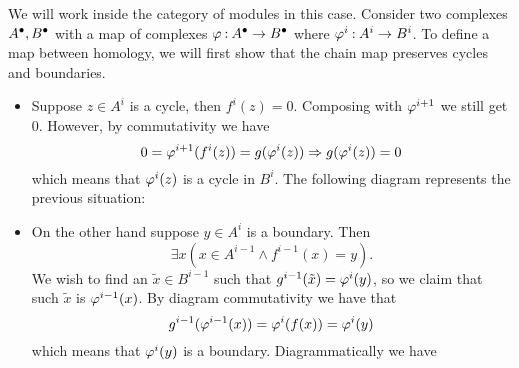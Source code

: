 \documentclass[12pt]{memoir}
\begin{document}
    \begin{ptcbr}
    We will work inside the category of modules in this case. Consider two complexes $A^\bullet,B^\bullet$ with a map of complexes $\varphi\mathbin{:}A^\bullet\to B^\bullet$ where $\varphi^i\mathbin{:} A^i\to B^i$. To define a map between homology, we will first show that the chain map preserves cycles and boundaries.
    \begin{itemize}
        \itemsep=-0.4em
        \item Suppose $z\in A^i$ is a cycle, then $f^i(z)=0$. Composing with $\varphi^{i+1}$ we still get $0$. However, by commutativity we have 
        $$0=\varphi^{i+1}(f^i(z))=g(\varphi^i(z))\Rightarrow g(\varphi^i(z))=0$$
        which means that $\varphi^{i}(z)$ is a cycle in $B^{i}$. The following diagram represents the previous situation:
        \begin{center}
        \end{center}
        \item On the other hand suppose $y\in A^{i}$ is a boundary. Then 
        $$\exists x(x\in A^{i-1}\land f^{i-1}(x)=y).$$
        We wish to find an $\widetilde{x}\in B^{i-1}$ such that $g^{i-1}(\tilde{x})=\varphi^i(y)$, so we claim that such $\widetilde{x}$ is $\varphi^{i-1}(x)$. By diagram commutativity we have that 
        $$g^{i-1}(\varphi^{i-1}(x))=\varphi^{i}(f(x))=\varphi^i(y)$$
        which means that $\varphi^i(y)$ is a boundary. Diagrammatically we have 
        \begin{center}

\end{center}
\end{itemize}
\end{ptcbr}
\end{document}
